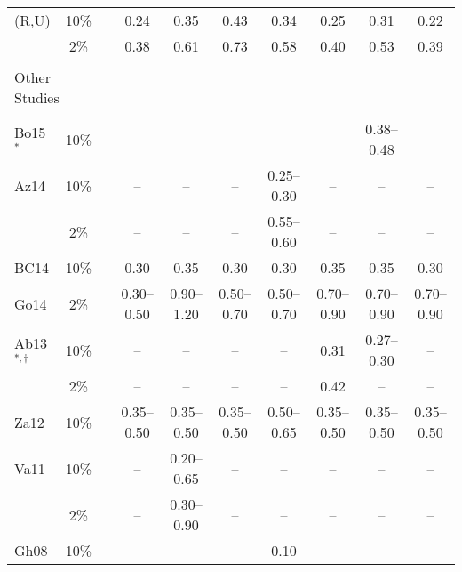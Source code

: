 \begin{table*}[t]
{\begin{tabular}{lccccccccc}
    (R,U)   &  10\%  &&   0.24      &   0.35      &   0.43      &   0.34      &   0.25      &   0.31      &   0.22      \\
            &   2\%  &&   0.38      &   0.61      &   0.73      &   0.58      &   0.40      &   0.53      &   0.39      \\
    \hline                                                                                                              \\[-1.6ex]
    \multicolumn{2}{l}{Other Studies}                                                                                   \\[0.6ex]
    \cline{1-2} \cline{4-10}                                                                                            \\[-1.6ex]
    Bo15${}^{*}$
            &  10\%  &&   --        &   --        &   --        &   --        &   --        & 0.38--0.48  &   --        \\
    Az14    &  10\%  &&   --        &   --        &   --        & 0.25--0.30  &   --        &     --      &   --        \\
            &   2\%  &&   --        &   --        &   --        & 0.55--0.60  &   --        &     --      &   --        \\
    BC14    &  10\%  &&   0.30      &   0.35      &   0.30      &   0.30      &   0.35      &   0.35      &   0.30      \\
    Go14    &   2\%  && 0.30--0.50  & 0.90--1.20  & 0.50--0.70  & 0.50--0.70  & 0.70--0.90  & 0.70--0.90  & 0.70--0.90  \\
    Ab13${}^{*,\dagger}$
            &  10\%  &&   --        &   --        &   --        &   --        &   0.31      & 0.27--0.30  &   --        \\
            &   2\%  &&   --        &   --        &   --        &   --        &   0.42      &     --      &   --        \\
    Za12    &  10\%  && 0.35--0.50  & 0.35--0.50  & 0.35--0.50  & 0.50--0.65  & 0.35--0.50  & 0.35--0.50  & 0.35--0.50  \\
    Va11    &  10\%  &&   --        & 0.20--0.65  &   --        &   --        &   --        &     --      &     --      \\
            &   2\%  &&   --        & 0.30--0.90  &   --        &   --        &   --        &     --      &     --      \\
    Gh08    &  10\%  &&   --        &   --        &   --        &   0.10      &   --        &     --      &     --      \\

\end{tabular}}
\end{table*}
